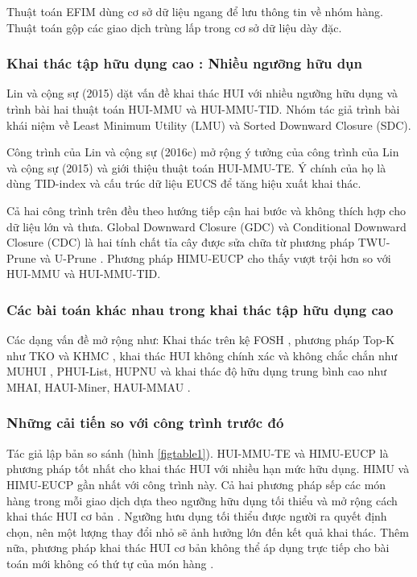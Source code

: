 Thuật toán EFIM \cite{zida2017efim} dùng cơ sở dữ liệu ngang để lưu thông tin về nhóm hàng. Thuật toán gộp các giao dịch trùng lấp trong cơ sở dữ liệu dày đặc. 

\subsubsection{Khai thác tập hữu dụng cao : Nhiều ngưỡng hữu dụn}

Lin và cộng sự (2015) \cite{lin2015mining} dặt vấn đề khai thác HUI với nhiều ngưỡng hữu dụng và trình bài hai thuật toán HUI-MMU và HUI-MMU-TID. Nhóm tác giả trình bài khái niệm về Least Minimum Utility (LMU) và Sorted Downward Closure (SDC). 

Công trình của Lin và cộng sự (2016c) \cite{lin2016efficient} mở rộng ý tưởng của công trình của Lin và cộng sự (2015) \cite{lin2015mining} và giới thiệu thuật toán HUI-MMU-TE. Ý chính của họ là dùng TID-index và cấu trúc dữ liệu EUCS \cite{fournier2014fhm} để tăng hiệu xuất khai thác. 

Cả hai công trình trên đều theo hướng tiếp cận hai bước và không thích hợp cho dữ liệu lớn và thưa. Global Downward Closure (GDC) và Conditional Downward Closure (CDC) \cite{gan2016more} là hai tính chất tỉa cây được sửa chữa từ phương pháp TWU-Prune \cite{liu2005two} và U-Prune \cite{liu2012mining}. Phương pháp HIMU-EUCP cho thấy vượt trội hơn so với HUI-MMU và HUI-MMU-TID. 

\subsubsection{Các bài toán khác nhau trong khai thác tập hữu dụng cao}

Các dạng vấn đề mở rộng như: Khai thác trên kệ FOSH \cite{fournier2015foshu}, phương pháp Top-K như TKO \cite{tseng2016aefficient} và KHMC \cite{duong2016aefficient}, khai thác HUI không chính xác và không chắc chắn như MUHUI \cite{Lin2017aEfficientlyMU}, PHUI-List\cite{lin2016befficient}, HUPNU và khai thác độ hữu dụng trung bình cao như MHAI, HAUI-Miner, HAUI-MMAU \cite{lin2016defficient}. 

\subsubsection{Những cải tiến so với công trình trước đó}

Tác giả lập bản so sánh (hình \ref{figtable1}). HUI-MMU-TE \cite{lin2016cefficient} và HIMU-EUCP \cite{gan2016more} là phương pháp tốt nhất cho khai thác HUI với nhiều hạn mức hữu dụng. HIMU và HIMU-EUCP \cite{gan2016more} gần nhất với công trình này. Cả hai phương pháp sếp các món hàng trong mỗi giao dịch dựa theo ngưỡng hữu dụng tối thiểu và mở rộng cách khai thác HUI cơ bản \cite{liu2012mining}. Ngưỡng hưu dụng tối thiểu được người ra quyết định chọn, nên một lượng thay đổi nhỏ sẽ ảnh hưởng lớn đến kết quả khai thác. Thêm nữa, phương pháp khai thác HUI cơ bản không thể áp dụng trực tiếp cho bài toán mới không có thứ tự của món hàng \cite{gan2016more} \cite{lin2016cefficient}. 

